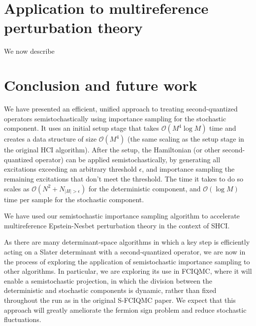\documentclass[english]{article}
\begin{document}

\section{Application to multireference perturbation theory}
We now describe

\section{Conclusion and future work}
We have presented an efficient, unified approach to treating second-quantized operators semistochastically using importance sampling for the stochastic component. It uses an initial setup stage that takes $\mathcal{O}(M^4\log M)$ time and creates a data structure of size $\mathcal{O}(M^4)$ (the same scaling as the setup stage in the original HCI algorithm). After the setup, the Hamiltonian (or other second-quantized operator) can be applied semistochastically, by generating all excitations exceeding an arbitrary threshold $\epsilon$, and importance sampling the remaining excitations that don't meet the threshold. The time it takes to do so scales as $\mathcal{O}(N^2 + N_{|H|>\epsilon})$ for the deterministic component, and $\mathcal{O}(\log M)$ time per sample for the stochastic component.

We have used our semistochastic importance sampling algorithm to accelerate multireference Epstein-Nesbet perturbation theory in the context of SHCI.

As there are many determinant-space algorithms in which a key step is efficiently acting on a Slater determinant with a second-quantized operator, we are now in the process of exploring the application of semistochastic importance sampling to other algorithms. In particular, we are exploring its use in FCIQMC, where it will enable a semistochastic projection, in which the division between the deterministic and stochastic components is dynamic, rather than fixed throughout the run as in the original S-FCIQMC paper. We expect that this approach will greatly ameliorate the fermion sign problem and reduce stochastic fluctuations.
\end{document}
